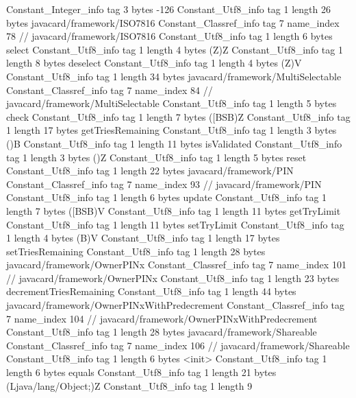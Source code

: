 {{{		}
		Constant_Integer_info {
			tag	3
			bytes	-126
		}
		Constant_Utf8_info {
			tag	1
			length	26
			bytes	javacard/framework/ISO7816
		}
		Constant_Classref_info {
			tag	7
			name_index	78		// javacard/framework/ISO7816
		}
		Constant_Utf8_info {
			tag	1
			length	6
			bytes	select
		}
		Constant_Utf8_info {
			tag	1
			length	4
			bytes	(Z)Z
		}
		Constant_Utf8_info {
			tag	1
			length	8
			bytes	deselect
		}
		Constant_Utf8_info {
			tag	1
			length	4
			bytes	(Z)V
		}
		Constant_Utf8_info {
			tag	1
			length	34
			bytes	javacard/framework/MultiSelectable
		}
		Constant_Classref_info {
			tag	7
			name_index	84		// javacard/framework/MultiSelectable
		}
		Constant_Utf8_info {
			tag	1
			length	5
			bytes	check
		}
		Constant_Utf8_info {
			tag	1
			length	7
			bytes	([BSB)Z
		}
		Constant_Utf8_info {
			tag	1
			length	17
			bytes	getTriesRemaining
		}
		Constant_Utf8_info {
			tag	1
			length	3
			bytes	()B
		}
		Constant_Utf8_info {
			tag	1
			length	11
			bytes	isValidated
		}
		Constant_Utf8_info {
			tag	1
			length	3
			bytes	()Z
		}
		Constant_Utf8_info {
			tag	1
			length	5
			bytes	reset
		}
		Constant_Utf8_info {
			tag	1
			length	22
			bytes	javacard/framework/PIN
		}
		Constant_Classref_info {
			tag	7
			name_index	93		// javacard/framework/PIN
		}
		Constant_Utf8_info {
			tag	1
			length	6
			bytes	update
		}
		Constant_Utf8_info {
			tag	1
			length	7
			bytes	([BSB)V
		}
		Constant_Utf8_info {
			tag	1
			length	11
			bytes	getTryLimit
		}
		Constant_Utf8_info {
			tag	1
			length	11
			bytes	setTryLimit
		}
		Constant_Utf8_info {
			tag	1
			length	4
			bytes	(B)V
		}
		Constant_Utf8_info {
			tag	1
			length	17
			bytes	setTriesRemaining
		}
		Constant_Utf8_info {
			tag	1
			length	28
			bytes	javacard/framework/OwnerPINx
		}
		Constant_Classref_info {
			tag	7
			name_index	101		// javacard/framework/OwnerPINx
		}
		Constant_Utf8_info {
			tag	1
			length	23
			bytes	decrementTriesRemaining
		}
		Constant_Utf8_info {
			tag	1
			length	44
			bytes	javacard/framework/OwnerPINxWithPredecrement
		}
		Constant_Classref_info {
			tag	7
			name_index	104		// javacard/framework/OwnerPINxWithPredecrement
		}
		Constant_Utf8_info {
			tag	1
			length	28
			bytes	javacard/framework/Shareable
		}
		Constant_Classref_info {
			tag	7
			name_index	106		// javacard/framework/Shareable
		}
		Constant_Utf8_info {
			tag	1
			length	6
			bytes	<init>
		}
		Constant_Utf8_info {
			tag	1
			length	6
			bytes	equals
		}
		Constant_Utf8_info {
			tag	1
			length	21
			bytes	(Ljava/lang/Object;)Z
		}
		Constant_Utf8_info {
			tag	1
			length	9
}}}
